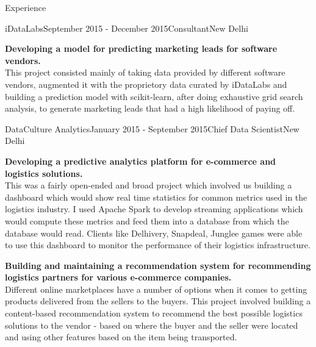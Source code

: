\documentclass{resume} %
\begin{document}
\begin{rSection}{Experience}
\begin{rSubsection}{iDataLabs}{September 2015 - December 2015}{Consultant}{New
    Delhi}
\item {\bf Developing a model for predicting marketing leads for software vendors.}\\
    This project consisted mainly of taking data provided by different software
    vendors, augmented it with the proprietory data curated by iDataLabs and
    building a prediction model with scikit-learn, after doing exhaustive grid
    search analysis, to generate marketing leads that had a high likelihood of
    paying off.

\end{rSubsection}

\begin{rSubsection}{DataCulture Analytics}{January 2015 - September 2015}{Chief
    Data Scientist}{New Delhi}
\item {\bf Developing a predictive analytics platform for e-commerce and logistics
    solutions.}\\
    This was a fairly open-ended and broad project which involved us building a
    dashboard which would show real time statistics for common metrics used in
    the logistics industry. I used Apache Spark to develop streaming
    applications which would compute these metrics and feed them into a
    database from which the database would read. Clients like Delhivery,
    Snapdeal, Junglee games were able to use this dashboard to monitor the
    performance of their logistics infrastructure.
\item {\bf Building and maintaining a recommendation system for recommending
    logistics partners for various e-commerce companies.}\\
    Different online marketplaces have a number of options when it comes to
    getting products delivered from the sellers to the buyers. This project
    involved building a content-based recommendation system to recommend the
    best possible logistics solutions to the vendor - based on where the buyer
    and the seller were located and using other features based on the item
    being transported.

\end{rSubsection}


\end{rSection}
\end{document}
